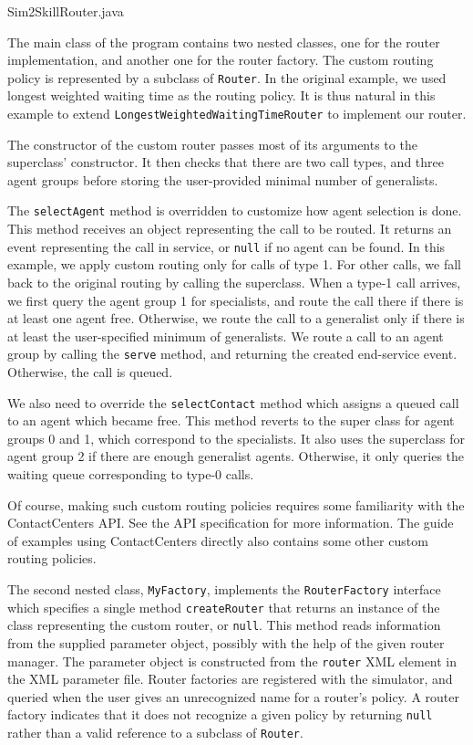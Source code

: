 
{Sim2SkillRouter.java}

The main class of the program contains two nested classes, one for the
router implementation, and another one for the router factory.
The custom routing policy is represented by a subclass of
\texttt{Router}.
In the original example, we used longest weighted waiting time as the
routing policy.
It is thus natural in this example to extend
\texttt{Longest\-Weighted\-Waiting\-Time\-Router} to implement our router.

The constructor of the custom router passes most of its arguments to
the superclass' constructor. It then checks that there are two call
types, and three agent groups before storing the user-provided minimal
number of generalists.

The \texttt{select\-Agent} method is overridden to customize how agent
selection is done.
This method receives an object representing the call to be routed.
It returns an event representing the call in service, or \texttt{null}
if no agent can be found.
In this example, we apply custom routing only for calls of type 1.
For other calls, we fall back to the original routing by calling the
superclass.
When a type-1 call arrives, we first query the agent group 1 for
specialists, and route the call there if there is at least one agent
free.
Otherwise, we route the call to a generalist only if there is at least
the user-specified minimum of generalists.
We route a call to an agent group by calling the \texttt{serve}
method, and returning the created end-service event.
Otherwise, the call is queued.

We also need to override the \texttt{select\-Contact} method which
assigns a queued call to an agent which became free.
This method reverts to the super class for agent groups 0 and 1, which
correspond to the specialists.
It also uses the superclass for agent group 2 if there are enough
generalist agents.
Otherwise, it only queries the waiting queue corresponding to type-0
calls.

Of course, making such custom routing policies requires some
familiarity with the ContactCenters API.
See the API specification for more information.
The guide of examples using ContactCenters directly also contains some
other custom routing policies.

The second nested class, \texttt{My\-Factory}, implements the
\texttt{Router\-Factory} interface which specifies
a single
method \texttt{create\-Router}
that returns an instance of the class representing the custom
router, or \texttt{null}.
This method reads information from the supplied parameter object, possibly
with the help of the given router manager.
The parameter object is constructed from the \texttt{router} XML
element in the XML parameter file.
Router factories are registered with the simulator, and
queried when the user gives an unrecognized name for a router's
policy.
A router factory indicates that it does not recognize a given policy
by returning \texttt{null} rather than a valid reference to a subclass
of \texttt{Router}.

